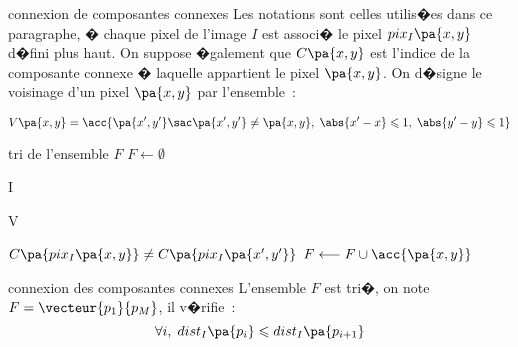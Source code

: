             \begin{xalgorithm}{connexion de composantes connexes}
            Les notations sont celles utilis�es dans ce paragraphe, � chaque pixel de l'image $I$ est associ� le pixel
            $pix_I\pa{x,y}$ d�fini plus haut. On suppose �galement que $C\pa{x,y}$ est l'indice de la composante 
            connexe � laquelle appartient le pixel $\pa{x,y}$. On d�signe le voisinage d'un pixel $\pa{x,y}$
            par l'ensemble~:
                    
                    $$
                    V\pa{x,y} = \acc{ \pa{x',y'} \sac \pa{x',y'} \neq \pa{x,y}, \; \abs{x'-x} \leqslant 1, 
                                                                \; \abs{y'-y} \leqslant 1 }
                    $$

            \begin{xalgostep}{tri de l'ensemble $F$}
            $F \longleftarrow \emptyset$ \\
            \begin{xforeach}{}{I}
                \begin{xforeach}{}{V}                
                    \begin{xif}{$C\pa{pix_I\pa{x,y}} \neq C\pa{pix_I\pa{x',y'}}$}
                            $F \longleftarrow F \cup \acc{ \pa{x,y} }$
                    \end{xif}
                \end{xforeach}
            \end{xforeach}
            \end{xalgostep}

            \begin{xalgostep}{connexion des composantes connexes}
            L'ensemble $F$ est tri�, on note $F = \vecteur{p_1}{p_M}$, il v�rifie~:
                    $$
                            \forall i, \; dist_I\pa{p_i} \leqslant dist_I\pa{p_{i+1}}
                    $$
            \end{xalgostep}
            
            

\end{xalgorithm}
